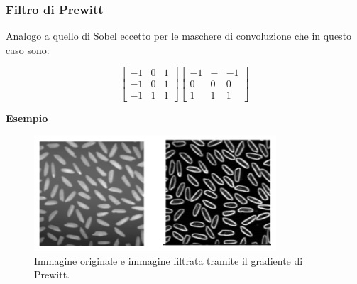 \subsubsection{Filtro di Prewitt}
Analogo a quello di Sobel eccetto per le maschere di convoluzione
che in questo caso sono:
\begin{center}
    \[
        \begin{bmatrix}
            -1 & 0 & 1 \\
            -1 & 0 & 1 \\
            -1 & 1 & 1
        \end{bmatrix}
        \begin{bmatrix}
            -1 & - & -1 \\
            0  & 0 & 0  \\
            1  & 1 & 1
        \end{bmatrix}
    \]
\end{center}
\textbf{Esempio}
\begin{figure}[H]
    \centering
    \includegraphics[width=\linewidth, keepaspectratio]{capitoli/immagini/imgs/prewitt.png}
    \caption*{Immagine originale e immagine filtrata tramite il gradiente
        di Prewitt.}
\end{figure}
